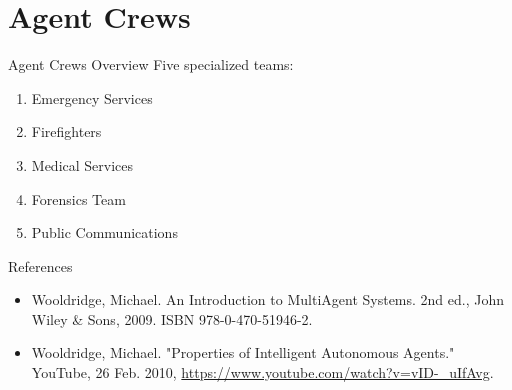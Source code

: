 \documentclass{beamer}
\begin{document}
\section{Agent Crews}
\begin{frame}{Agent Crews Overview}
    Five specialized teams:
    \begin{enumerate}
        \item Emergency Services
        \item Firefighters
        \item Medical Services
        \item Forensics Team
        \item Public Communications
    \end{enumerate}
\end{frame}







\begin{frame}{References}
    \begin{itemize}
        \item Wooldridge, Michael. An Introduction to MultiAgent Systems. 2nd ed., John Wiley \& Sons, 2009. ISBN 978-0-470-51946-2.
        \item Wooldridge, Michael. "Properties of Intelligent Autonomous Agents." YouTube, 26 Feb. 2010, \url{https://www.youtube.com/watch?v=vID-_uIfAvg}.
    \end{itemize}
\end{frame}
\end{document}
